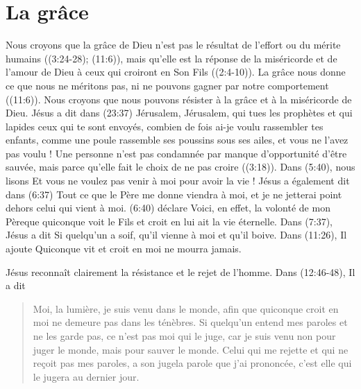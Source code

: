 \section*{La grâce}

\begin{digestpar}{}
\begin{pocketpar}{}
Nous croyons que la grâce de Dieu n'est pas le résultat de l'effort
 ou du mérite humains
 ((3:24-28); (11:6)),
 mais qu'elle est la réponse
 de la miséricorde et de l'amour de Dieu à ceux qui croiront en Son Fils
 ((2:4-10)).
 La grâce nous donne 
 ce que nous ne méritons pas, ni ne pouvons gagner par notre comportement
 ((11:6)).
 Nous croyons que nous pouvons résister à la grâce et à la miséricorde de Dieu.
 Jésus a dit dans (23:37)\frcolon
 \Og Jérusalem, Jérusalem, qui tues les prophètes et qui lapides ceux
 qui te sont envoyés, combien de fois ai-je voulu rassembler tes enfants,
 comme une poule rassemble ses poussins sous ses ailes, et vous ne l'avez pas voulu ! \Fg{}
 Une personne n'est pas condamnée par manque d'opportunité d'être sauvée, 
 mais parce qu'elle fait le choix de ne pas croire
 ((3:18)).
 Dans (5:40), nous lisons\frcolon
 \Og Et vous ne voulez pas venir à moi pour avoir la vie ! \Fg{}
 Jésus a également dit dans (6:37)\frcolon
 \Og Tout ce que le Père me donne viendra à moi,
 et je ne jetterai point dehors celui qui vient à moi. \Fg{}
 (6:40) déclare\frcolon
 \Og Voici, en effet, la volonté de mon Père\frcolon que quiconque voit le Fils
 et croit en lui ait la vie éternelle. \Fg{}
 Dans (7:37), Jésus a dit\frcolon
 \Og Si quelqu'un a soif, qu'il vienne à moi et qu'il boive. \Fg{}
 Dans (11:26), Il ajoute\frcolon
 \Og Quiconque vit et croit en moi ne mourra jamais. \Fg{}
\end{pocketpar}
\end{digestpar}

\begin{pocketpar}{}
Jésus reconnaît clairement la résistance et le rejet de l'hom\-me.
 Dans (12:46-48), Il a dit\frcolon
\end{pocketpar}

\pocketpagebreak

\begin{quote}
\begin{pocketpar}{}
 \Og Moi, la lumière, je suis venu dans le monde, afin que quiconque croit
 en moi ne demeure pas dans les ténèbres. Si quelqu'un entend mes paroles
 et ne les garde pas, ce n'est pas moi qui le juge, car je suis venu non
 pour juger le monde, mais pour sauver le monde. Celui qui me rejette et qui
 ne reçoit pas mes paroles, a son juge\frcolon la parole que j'ai prononcée,
 c'est elle qui le jugera au dernier jour. \Fg{}
\end{pocketpar}
\end{quote}

